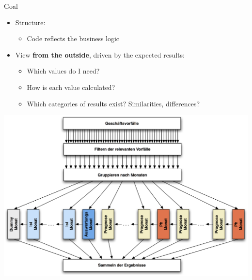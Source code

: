 \begin{frame}[fragile]{Goal}

\begin{minipage}{.45\paperwidth}
\begin{itemize}
\item Structure:
\begin{itemize}
\item Code reflects the business logic
\end{itemize}
\end{itemize}

\begin{itemize}
\item View \textbf{from the outside}, driven by the expected results:
\begin{itemize}
\item Which values do I need?
\item How is each value calculated?
\item Which categories of results exist? Similarities, differences?
\end{itemize}
\end{itemize}
\end{minipage} \hfill
\begin{minipage}{.45\paperwidth}
\includegraphics[width=\textwidth]{DynamischFein.jpg}
\end{minipage}

\end{frame}

